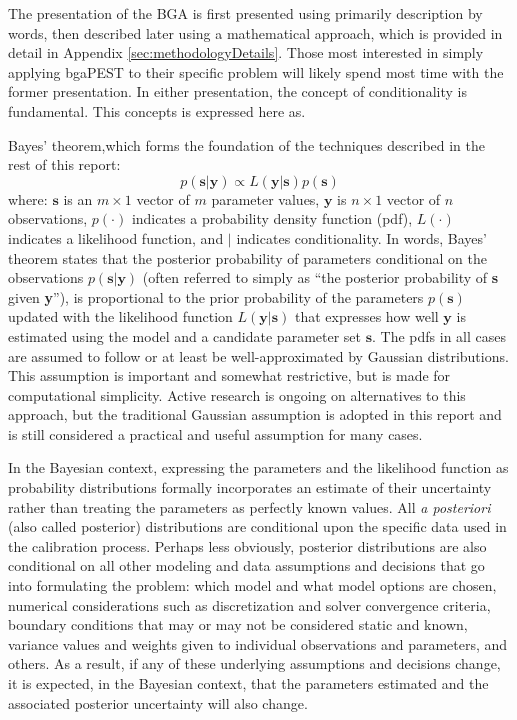 \documentclass[11pt,oneside,onecolumn]{usgsreport}
\begin{document}
\begin{multicols}{2}
\begin{bibunit}
The presentation of the BGA is first presented using primarily description
by words, then described later using a mathematical approach, which
is provided in detail in Appendix \ref{sec:methodologyDetails}. Those most interested in simply
applying bgaPEST to their specific problem will likely spend most
time with the former presentation. In either presentation,  the concept
of conditionality is fundamental. This concepts is expressed here
as. 

Bayes' theorem,which forms the foundation of the techniques described
in the rest of this report:
\begin{equation}
p\left(\mathbf{s}|\mathbf{y}\right)\propto L\left(\mathbf{y}|\mathbf{s}\right)p\left(\mathbf{s}\right)\label{eq:bayes1}
\end{equation}
where: $\mathbf{s}$ is an $m\times1$ vector of $m$ parameter values,
$\mathbf{y}$ is $n\times1$ vector of $n$ observations, $p\left(\cdot\right)$
indicates a probability density function (pdf), $L\left(\cdot\right)$
indicates a likelihood function, and $|$ indicates conditionality.
In words, Bayes' theorem states that the posterior probability of
parameters conditional on the observations $p\left(\mathbf{s}|\mathbf{y}\right)$
(often referred to simply as ``the posterior probability of \textbf{s}
given \textbf{y}''), is proportional to the prior probability of
the parameters $p\left(\mathbf{s}\right)$ updated with the likelihood
function $L\left(\mathbf{y}|\mathbf{s}\right)$ that expresses how
well $\mathbf{y}$ is estimated using the model and a candidate parameter
set $\mathbf{s}$. The pdfs in all cases are assumed to follow or
at least be well-approximated by Gaussian distributions. This assumption
is important and somewhat restrictive, but is made for computational
simplicity. Active research is ongoing on alternatives to this approach,
but the traditional Gaussian assumption is adopted in this report
and is still considered a practical and useful assumption for many
cases.

In the Bayesian context, expressing the parameters and the likelihood
function as probability distributions formally incorporates an estimate
of their uncertainty rather than treating the parameters as perfectly
known values. All \emph{a posteriori }(also called posterior) distributions
are conditional upon the specific data used in the calibration process.
Perhaps less obviously, posterior distributions are also conditional
on all other modeling and data assumptions and decisions that go into
formulating the problem: which model and what model options are chosen,
numerical considerations such as discretization and solver convergence
criteria, boundary conditions that may or may not be considered static
and known, variance values and weights given to individual observations
and parameters, and others. As a result, if any of these underlying
assumptions and decisions change, it is expected, in the Bayesian
context, that the parameters estimated and the associated posterior
uncertainty will also change. 


\end{bibunit}
\end{multicols}
\end{document}
